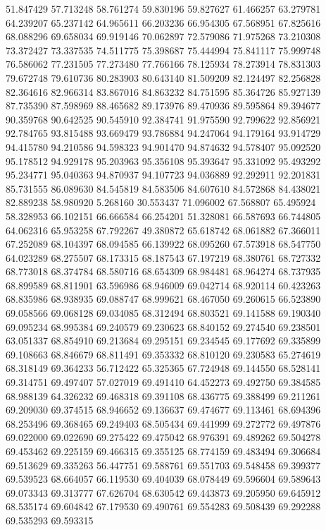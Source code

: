 51.847429
57.713248
58.761274
59.830196
59.827627
61.466257
63.279781
64.239207
65.237142
64.965611
66.203236
66.954305
67.568951
67.825616
68.088296
69.658034
69.919146
70.062897
72.579086
71.975268
73.210308
73.372427
73.337535
74.511775
75.398687
75.444994
75.841117
75.999748
76.586062
77.231505
77.273480
77.766166
78.125934
78.273914
78.831303
79.672748
79.610736
80.283903
80.643140
81.509209
82.124497
82.256828
82.364616
82.966314
83.867016
84.863232
84.751595
85.364726
85.927139
87.735390
87.598969
88.465682
89.173976
89.470936
89.595864
89.394677
90.359768
90.642525
90.545910
92.384741
91.975590
92.799622
92.856921
92.784765
93.815488
93.669479
93.786884
94.247064
94.179164
93.914729
94.415780
94.210586
94.598323
94.901470
94.874632
94.578407
95.092520
95.178512
94.929178
95.203963
95.356108
95.393647
95.331092
95.493292
95.234771
95.040363
94.870937
94.107723
94.036889
92.292911
92.201831
85.731555
86.089630
84.545819
84.583506
84.607610
84.572868
84.438021
82.889238
58.980920
5.268160
30.553437
71.096002
67.568807
65.495924
58.328953
66.102151
66.666584
66.254201
51.328081
66.587693
66.744805
64.062316
65.953258
67.792267
49.380872
65.618742
68.061882
67.366011
67.252089
68.104397
68.094585
66.139922
68.095260
67.573918
68.547750
64.023289
68.275507
68.173315
68.187543
67.197219
68.380761
68.727332
68.773018
68.374784
68.580716
68.654309
68.984481
68.964274
68.737935
68.899589
68.811901
63.596986
68.946009
69.042714
68.920114
60.423263
68.835986
68.938935
69.088747
68.999621
68.467050
69.260615
66.523890
69.058566
69.068128
69.034085
68.312494
68.803521
69.141588
69.190340
69.095234
68.995384
69.240579
69.230623
68.840152
69.274540
69.238501
63.051337
68.854910
69.213684
69.295151
69.234545
69.177692
69.335899
69.108663
68.846679
68.811491
69.353332
68.810120
69.230583
65.274619
68.318149
69.364233
56.712422
65.325365
67.724948
69.144550
68.528141
69.314751
69.497407
57.027019
69.491410
64.452273
69.492750
69.384585
68.988139
64.326232
69.468318
69.391108
68.436775
69.388499
69.211261
69.209030
69.374515
68.946652
69.136637
69.474677
69.113461
68.694396
68.253496
69.368465
69.249403
68.505434
69.441999
69.272772
69.497876
69.022000
69.022690
69.275422
69.475042
68.976391
69.489262
69.504278
69.453462
69.225159
69.466315
69.355125
68.774159
69.483494
69.306684
69.513629
69.335263
56.447751
69.588761
69.551703
69.548458
69.399377
69.539523
68.664057
66.119530
69.404039
68.078449
69.596604
69.589643
69.073343
69.313777
67.626704
68.630542
69.443873
69.205950
69.645912
68.535174
69.604842
67.179530
69.490761
69.554283
69.508439
69.292288
69.535293
69.593315
